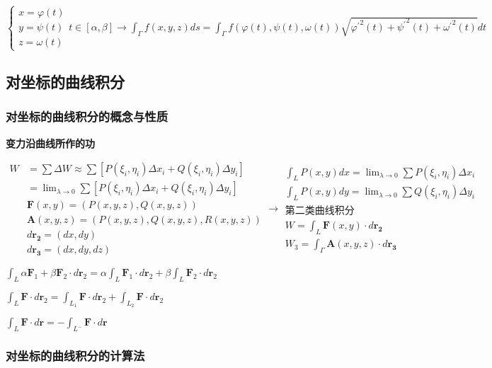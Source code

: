 \documentclass[UTF8]{ctexart}
\newcommand{\mb}[1]{\textbf{#1}}
\newcommand{\mf}[1]{\left( #1\right)}
\newcommand{\mfc}[1]{\left[ #1 \right]}
\newcommand{\p}{\par}
\newcommand{\ma}[1]{\begin{array}{llll} #1 \end{array}}
\newcommand{\fcz}[1] {
    \left\{
        \begin{array}{llll} #1 \end{array}
    \right.
}
\newcommand{\mseq}{\approx }
\begin{document}
$\fcz{
    x=\varphi\mf{t}\\
    y=\psi\mf{t} \\
    z=\omega\mf{t}
}t\in \mfc{\alpha,\beta} \rightarrow \int_\Gamma f\mf{x,y,z}ds=\int_\Gamma f\mf{\varphi\mf{t},\psi\mf{t},\omega\mf{t}}\sqrt{{\varphi^{'}}^2\mf{t}+{\psi^{'}}^2\mf{t}+{\omega^{'}}^2\mf{t}}dt$



\subsection{对坐标的曲线积分}

\subsubsection{对坐标的曲线积分的概念与性质}

\mb{变力沿曲线所作的功}\p
$\ma{
    W&=\sum \Delta W \mseq \sum \mfc{P\mf{\xi_i,\eta_i}\Delta x_i+Q\mf{\xi_i,\eta_i} \Delta y_i}\\
    &=\lim_{\lambda \rightarrow 0}\sum \mfc{P\mf{\xi_i,\eta_i}\Delta x_i+Q\mf{\xi_i,\eta_i} \Delta y_i}\\
    &\mb{F}\mf{x,y}=\mf{P\mf{x,y,z},Q\mf{x,y,z}}\\
    &\mb{A}\mf{x,y,z}=\mf{P\mf{x,y,z},Q\mf{x,y,z},R\mf{x,y,z}}\\
    &d \mb{r}_\mb{2}=\mf{dx,dy}\\
    &d \mb{r}_\mb{3}=\mf{dx,dy,dz}

}\rightarrow \ma{
    \int_L P\mf{x,y}dx=\lim_{\lambda \rightarrow 0}\sum P\mf{\xi_i,\eta_i}\Delta x_i\\
    \int_L P\mf{x,y}dy=\lim_{\lambda \rightarrow 0}\sum Q\mf{\xi_i,\eta_i}\Delta y_i\\
    \mb{第二类曲线积分}\\
    W=\int_L \mb{F}\mf{x,y}\cdot d \mb{r}_\mb{2}\\
    W_3=\int_\Gamma \mb{A}\mf{x,y,z} \cdot d \mb{r}_\mb{3}
}$


$\int_L \alpha \mb{F}_1 + \beta \mb{F}_2 \cdot d \mb{r}_2=\alpha\int_L   \mb{F}_1 \cdot d \mb{r}_2+\beta \int_L   \mb{F}_2 \cdot d \mb{r}_2$

$\int_L\mb{F}\cdot d \mb{r}_2=\int_{L_1}\mb{F}\cdot d \mb{r}_2+\int_{L_2}\mb{F}\cdot d \mb{r}_2$

$\int_L\mb{F}\cdot d \mb{r}=-\int_{L^-}\mb{F}\cdot d \mb{r}$

\subsubsection{对坐标的曲线积分的计算法}
\end{document}
